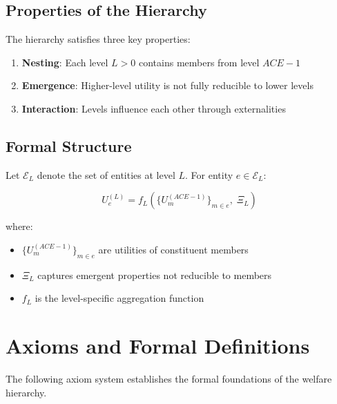\subsection{Properties of the Hierarchy}

The hierarchy satisfies three key properties:

\begin{enumerate}
\item \textbf{Nesting}: Each level $L > 0$ contains members from level $ACE-1$
\item \textbf{Emergence}: Higher-level utility is not fully reducible to lower levels
\item \textbf{Interaction}: Levels influence each other through externalities
\end{enumerate}

\subsection{Formal Structure}

Let $\mathcal{E}_L$ denote the set of entities at level $L$. For entity $e \in \mathcal{E}_L$:

\begin{equation}
U_e^{(L)} = f_L\left( \{U_m^{(ACE-1)}\}_{m \in e}, \; \Xi_L \right)
\end{equation}

where:
\begin{itemize}
\item $\{U_m^{(ACE-1)}\}_{m \in e}$ are utilities of constituent members
\item $\Xi_L$ captures emergent properties not reducible to members
\item $f_L$ is the level-specific aggregation function
\end{itemize}


\section{Axioms and Formal Definitions}
\label{sec:who-axioms}

The following axiom system establishes the formal foundations of the welfare hierarchy.

